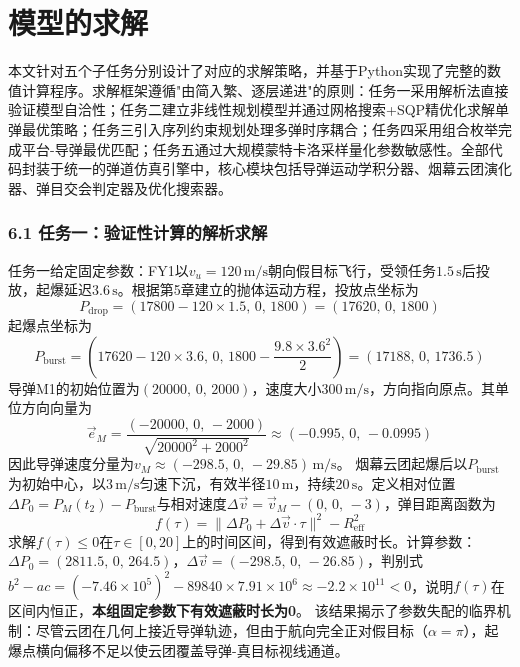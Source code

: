 \documentclass{JXUSTmodeling}
\begin{document}
\section{模型的求解}
本文针对五个子任务分别设计了对应的求解策略，并基于Python实现了完整的数值计算程序。求解框架遵循"由简入繁、逐层递进"的原则：任务一采用解析法直接验证模型自洽性；任务二建立非线性规划模型并通过网格搜索+SQP精优化求解单弹最优策略；任务三引入序列约束规划处理多弹时序耦合；任务四采用组合枚举完成平台-导弹最优匹配；任务五通过大规模蒙特卡洛采样量化参数敏感性。全部代码封装于统一的弹道仿真引擎中，核心模块包括导弹运动学积分器、烟幕云团演化器、弹目交会判定器及优化搜索器。
\subsubsection{6.1 任务一：验证性计算的解析求解}
任务一给定固定参数：FY1以$v_u=120\,\mathrm{m/s}$朝向假目标飞行，受领任务$1.5\,\mathrm{s}$后投放，起爆延迟$3.6\,\mathrm{s}$。根据第5章建立的抛体运动方程，投放点坐标为
$$P_{\text{drop}}=(17800-120\times1.5,\,0,\,1800)=(17620,\,0,\,1800)$$
起爆点坐标为
$$P_{\text{burst}}=(17620-120\times3.6,\,0,\,1800-\frac{9.8\times3.6^2}{2})=(17188,\,0,\,1736.5)$$
导弹M1的初始位置为$(20000,\,0,\,2000)$，速度大小$300\,\mathrm{m/s}$，方向指向原点。其单位方向向量为
$$\vec{e}_M=\frac{(-20000,\,0,\,-2000)}{\sqrt{20000^2+2000^2}}\approx(-0.995,\,0,\,-0.0995)$$
因此导弹速度分量为$v_M\approx(-298.5,\,0,\,-29.85)\,\mathrm{m/s}$。
烟幕云团起爆后以$P_{\text{burst}}$为初始中心，以$3\,\mathrm{m/s}$匀速下沉，有效半径$10\,\mathrm{m}$，持续$20\,\mathrm{s}$。定义相对位置$\Delta P_0=P_M(t_2)-P_{\text{burst}}$与相对速度$\Delta\vec{v}=\vec{v}_M-(0,\,0,\,-3)$，弹目距离函数为
$$f(\tau)=\|\Delta P_0+\Delta\vec{v}\cdot\tau\|^2-R_{\text{eff}}^2$$
求解$f(\tau)\leq0$在$\tau\in[0,20]$上的时间区间，得到有效遮蔽时长。计算参数：$\Delta P_0=(2811.5,\,0,\,264.5)$，$\Delta\vec{v}=(-298.5,\,0,\,-26.85)$，判别式$b^2-ac=(-7.46\times10^5)^2-89840\times7.91\times10^6\approx-2.2\times10^{11}<0$，说明$f(\tau)$在区间内恒正，\textbf{本组固定参数下有效遮蔽时长为0}。
该结果揭示了参数失配的临界机制：尽管云团在几何上接近导弹轨迹，但由于航向完全正对假目标（$\alpha=\pi$），起爆点横向偏移不足以使云团覆盖导弹-真目标视线通道。
\end{document}
